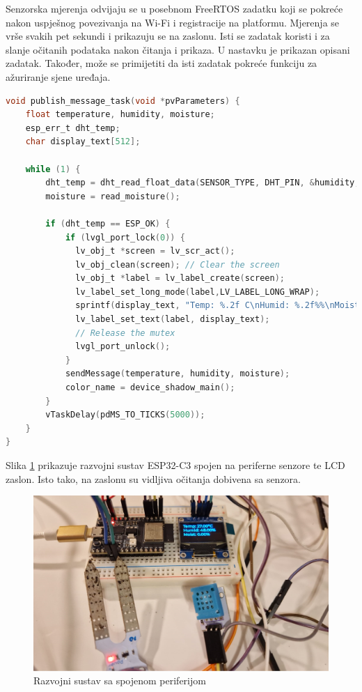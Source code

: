 Senzorska mjerenja odvijaju se u posebnom FreeRTOS zadatku koji se pokreće nakon uspješnog povezivanja na Wi-Fi i registracije na platformu. Mjerenja se vrše svakih pet sekundi i prikazuju se na zaslonu. Isti se zadatak koristi i za slanje očitanih podataka nakon čitanja i prikaza. U nastavku je prikazan opisani zadatak. Također, može se primijetiti da isti zadatak pokreće funkciju za ažuriranje sjene uređaja. 

\begin{lstlisting}[caption={FreeRTOS zadatak za očitanje senzorskih mjerenja i slanje podataka}, language=c]
void publish_message_task(void *pvParameters) {
	float temperature, humidity, moisture;
	esp_err_t dht_temp;
	char display_text[512];
	
	while (1) {
		dht_temp = dht_read_float_data(SENSOR_TYPE, DHT_PIN, &humidity, &temperature) != ESP_OK;
		moisture = read_moisture();
		
		if (dht_temp == ESP_OK) {
			if (lvgl_port_lock(0)) {
			  lv_obj_t *screen = lv_scr_act();
			  lv_obj_clean(screen); // Clear the screen
			  lv_obj_t *label = lv_label_create(screen);
			  lv_label_set_long_mode(label,LV_LABEL_LONG_WRAP);
			  sprintf(display_text, "Temp: %.2f C\nHumid: %.2f%%\nMoist: %.2f%%", temperature, humidity, moisture);
			  lv_label_set_text(label, display_text);
			  // Release the mutex
			  lvgl_port_unlock();
			}
			sendMessage(temperature, humidity, moisture);
			color_name = device_shadow_main();
		}
		vTaskDelay(pdMS_TO_TICKS(5000));
	}
}
\end{lstlisting}

Slika \ref{fig:complete_device} prikazuje razvojni sustav ESP32-C3 spojen na periferne senzore te LCD zaslon. Isto tako, na zaslonu su vidljiva očitanja dobivena sa senzora. 

\begin{figure}[ht]
	\centering
	\includegraphics[scale=0.2]{imgs/complete_device}
	\caption{Razvojni sustav sa spojenom periferijom}
	\label{fig:complete_device}
\end{figure}

